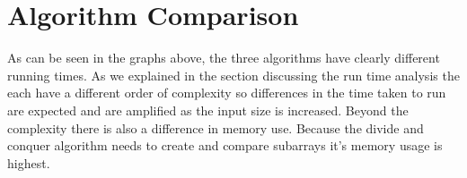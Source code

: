 \documentclass[12pt]{article}
\begin{document}
\section{Algorithm Comparison}
As can be seen in the graphs above, the three algorithms have clearly different
running times.  As we explained in the section discussing the run time analysis
the each have a different order of complexity so differences in the time taken
to run are expected and are amplified as the input size is increased.  Beyond
the complexity there is also a difference in memory use.  Because the divide
and conquer algorithm needs to create and compare subarrays it's memory usage
is highest. 
\end{document}
